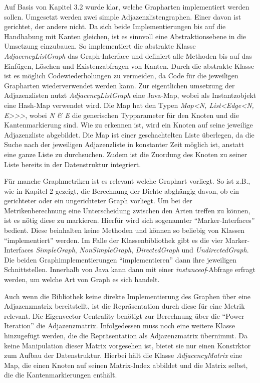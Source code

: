 \documentclass[a4paper,12pt,ngerman,chapterprefix=false,listof=totoc,bibliography=totoc]{scrreprt}
\begin{document}
{{{Auf Basis von Kapitel 3.2 wurde klar, welche Grapharten implementiert werden sollen. Umgesetzt werden zwei simple Adjazenzlistengraphen. Einer davon ist gerichtet, der andere nicht. Da sich beide Implementierungen bis auf die Handhabung mit Kanten gleichen, ist es sinnvoll eine Abstraktionsebene in die Umsetzung einzubauen. So implementiert die abstrakte Klasse \textit{AdjacencyListGraph} das Graph-Interface und definiert alle Methoden bis auf das Einfügen, Löschen und Existenzabfragen von Kanten. Durch die abstrakte Klasse ist es möglich Codewiederholungen zu vermeiden, da Code für die jeweiligen Grapharten wiederverwendet werden kann. Zur eigentlichen umsetzung der Adjazenzlisten nutzt \textit{AdjacencyListGraph} eine Java-Map, wobei als Instantzobjekt eine Hash-Map verwendet wird. Die Map hat den Typen \textit{Map\textless N, List\textless Edge\textless N, E\textgreater\textgreater\textgreater}, wobei \textit{N \& E} die generischen Typparameter für den Knoten und die Kantenmarkierung sind. Wie zu erkennen ist, wird ein Knoten auf seine jeweilige Adjazenzliste abgebildet. Die Map ist einer geschachtelten Liste überlegen, da die Suche nach der jeweiligen Adjazenzliste in konstanter Zeit möglich ist, anstatt eine ganze Liste zu durchsuchen. Zudem ist die Zuordung des Knoten zu seiner Liste bereits in der Datenstruktur integriert.

Für manche Graphmetriken ist es relevant welche Graphart vorliegt. So ist z.B., wie in Kapitel 2 gezeigt, die Berechnung der Dichte abghängig davon, ob ein gerichteter oder ein ungerichteter Graph vorliegt. Um bei der Metrikenberechnung eine Unterscheidung zwischen den Arten treffen zu können, ist es nötig diese zu markieren. Hierfür wird sich sogenannter "`Marker-Interfaces"' bedient. Diese beinhalten keine Methoden und können so beliebig von Klassen "`implementiert"' werden. Im Falle der Klassenbibliothek gibt es die vier Marker-Interfaces \textit{SimpleGraph}, \textit{NonSimpleGraph}, \textit{DirectedGraph} und \textit{UndirectedGraph}. Die beiden Graphimplementierungen "`implementieren"' dann ihre jeweiligen Schnittstellen. Innerhalb von Java kann dann mit einer \textit{instanceof}-Abfrage erfragt werden, um welche Art von Graph es sich handelt.

Auch wenn die Bibliothek keine direkte Implementierung des Graphen über eine Adjazenzmatrix bereitstellt, ist die Repräsentation durch diese für eine Metrik relevant. Die Eigenvector Centrality benötigt zur Berechnung über die "`Power Iteration"' die Adjazenzmatrix. Infolgedessen muss noch eine weitere Klasse hinzugefügt werden, die die Repräsentation als Adjazenzmatrix übernimmt. Da keine Manipulation dieser Matrix vorgesehen ist, bietet sie nur einen Konstrktor zum Aufbau der Datenstruktur. Hierbei hält die Klasse \textit{AdjacencyMatrix} eine Map, die einen Knoten auf seinen Matrix-Index abbildet und die Matrix selbst, die die Kantenmarkierungen enthält.

}}}
\end{document}

